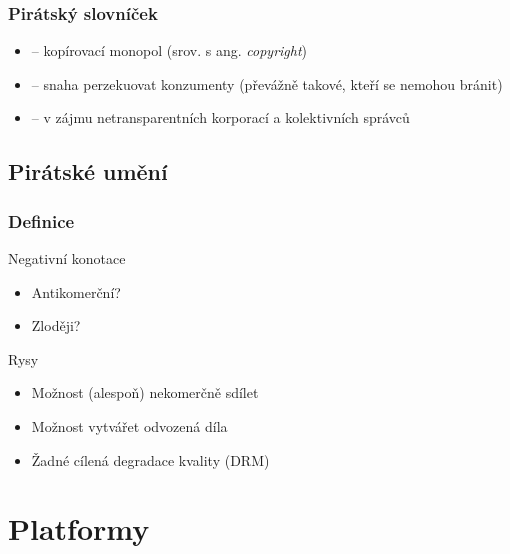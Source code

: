 \documentclass[xetex]{beamer}
\begin{document}
\begin{frame}
 \frametitle{Pirátský slovníček}
 \begin{itemize}
  \item {} -- kopírovací monopol (srov. s ang. \emph{copyright})
  \item {} -- snaha perzekuovat konzumenty (převážně takové, kteří se nemohou bránit)
  \item {} -- v zájmu netransparentních korporací a kolektivních správců
  \end{itemize}
\end{frame}

\subsection{Pirátské umění}
\begin{frame}
  \frametitle{Definice }
  \begin{block}{Negativní konotace}
    \begin{itemize}
      \item Antikomerční?
      \item Zloději?
    \end{itemize}
  \end{block}
  \begin{block}{Rysy}
    \begin{itemize}
      \item Možnost (alespoň) nekomerčně sdílet
      \item Možnost vytvářet odvozená díla
      \item Žadné cílená degradace kvality (DRM)
    \end{itemize}
  \end{block}
\end{frame}

\section{Platformy}
\end{document}

